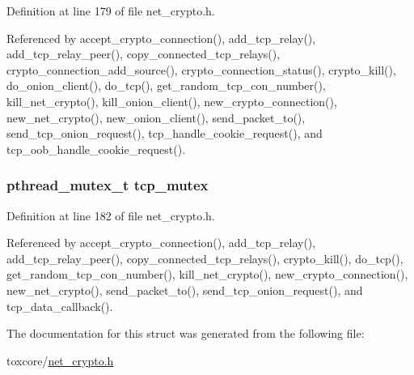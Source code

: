 Definition at line 179 of file net\+\_\+crypto.\+h.



Referenced by accept\+\_\+crypto\+\_\+connection(), add\+\_\+tcp\+\_\+relay(), add\+\_\+tcp\+\_\+relay\+\_\+peer(), copy\+\_\+connected\+\_\+tcp\+\_\+relays(), crypto\+\_\+connection\+\_\+add\+\_\+source(), crypto\+\_\+connection\+\_\+status(), crypto\+\_\+kill(), do\+\_\+onion\+\_\+client(), do\+\_\+tcp(), get\+\_\+random\+\_\+tcp\+\_\+con\+\_\+number(), kill\+\_\+net\+\_\+crypto(), kill\+\_\+onion\+\_\+client(), new\+\_\+crypto\+\_\+connection(), new\+\_\+net\+\_\+crypto(), new\+\_\+onion\+\_\+client(), send\+\_\+packet\+\_\+to(), send\+\_\+tcp\+\_\+onion\+\_\+request(), tcp\+\_\+handle\+\_\+cookie\+\_\+request(), and tcp\+\_\+oob\+\_\+handle\+\_\+cookie\+\_\+request().

\hypertarget{struct_net___crypto_a2e8f7f4dff2f2fc4ac2cc32b0c886974}{
\subsubsection[{tcp\+\_\+mutex}]{\setlength{\rightskip}{0pt plus 5cm}pthread\+\_\+mutex\+\_\+t tcp\+\_\+mutex}}\label{struct_net___crypto_a2e8f7f4dff2f2fc4ac2cc32b0c886974}


Definition at line 182 of file net\+\_\+crypto.\+h.



Referenced by accept\+\_\+crypto\+\_\+connection(), add\+\_\+tcp\+\_\+relay(), add\+\_\+tcp\+\_\+relay\+\_\+peer(), copy\+\_\+connected\+\_\+tcp\+\_\+relays(), crypto\+\_\+kill(), do\+\_\+tcp(), get\+\_\+random\+\_\+tcp\+\_\+con\+\_\+number(), kill\+\_\+net\+\_\+crypto(), new\+\_\+crypto\+\_\+connection(), new\+\_\+net\+\_\+crypto(), send\+\_\+packet\+\_\+to(), send\+\_\+tcp\+\_\+onion\+\_\+request(), and tcp\+\_\+data\+\_\+callback().



The documentation for this struct was generated from the following file\+:\begin{DoxyCompactItemize}
\item 
toxcore/\hyperlink{net__crypto_8h}{net\+\_\+crypto.\+h}\end{DoxyCompactItemize}
